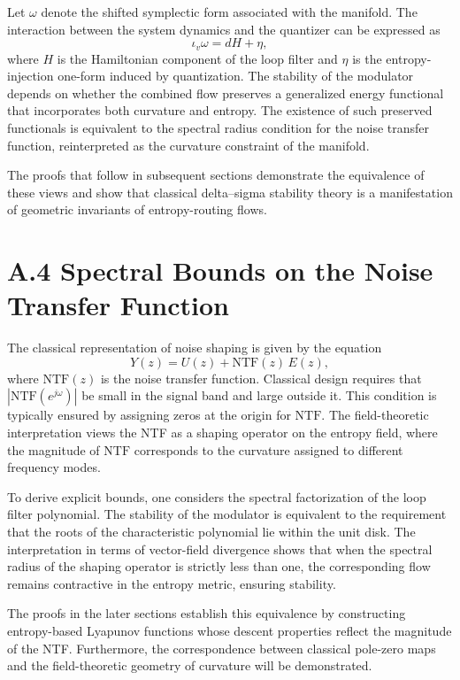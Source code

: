 Let \(\omega\) denote the shifted symplectic form associated with the manifold. The interaction between the system dynamics and the quantizer can be expressed as
\[
\iota_{v} \omega = dH + \eta,
\]
where \(H\) is the Hamiltonian component of the loop filter and \(\eta\) is the entropy-injection one-form induced by quantization. The stability of the modulator depends on whether the combined flow preserves a generalized energy functional that incorporates both curvature and entropy. The existence of such preserved functionals is equivalent to the spectral radius condition for the noise transfer function, reinterpreted as the curvature constraint of the manifold.

The proofs that follow in subsequent sections demonstrate the equivalence of these views and show that classical delta–sigma stability theory is a manifestation of geometric invariants of entropy-routing flows.

\section{A.4 Spectral Bounds on the Noise Transfer Function}

The classical representation of noise shaping is given by the equation
\[
Y(z) = U(z) + \mathrm{NTF}(z)\,E(z),
\]
where \(\mathrm{NTF}(z)\) is the noise transfer function. Classical design requires that \(|\mathrm{NTF}(e^{j\omega})|\) be small in the signal band and large outside it. This condition is typically ensured by assigning zeros at the origin for \(\mathrm{NTF}\). The field-theoretic interpretation views the NTF as a shaping operator on the entropy field, where the magnitude of \(\mathrm{NTF}\) corresponds to the curvature assigned to different frequency modes.

To derive explicit bounds, one considers the spectral factorization of the loop filter polynomial. The stability of the modulator is equivalent to the requirement that the roots of the characteristic polynomial lie within the unit disk. The interpretation in terms of vector-field divergence shows that when the spectral radius of the shaping operator is strictly less than one, the corresponding flow remains contractive in the entropy metric, ensuring stability.

The proofs in the later sections establish this equivalence by constructing entropy-based Lyapunov functions whose descent properties reflect the magnitude of the NTF. Furthermore, the correspondence between classical pole-zero maps and the field-theoretic geometry of curvature will be demonstrated.

